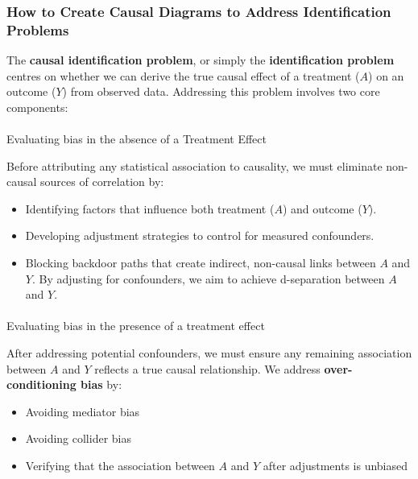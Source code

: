 \documentclass[
  singlecolumn]{article}
\makeatletter
\let\oldparagraph\paragraph
\renewcommand{\paragraph}{
    \@ifstar
      \xxxParagraphStar
      \xxxParagraphNoStar
  }
\newcommand{\xxxParagraphStar}[1]{\oldparagraph*{#1}\mbox{}}
\newcommand{\xxxParagraphNoStar}[1]{\oldparagraph{#1}\mbox{}}
\providecommand{\tightlist}{%
  \setlength{\itemsep}{0pt}\setlength{\parskip}{0pt}}\usepackage{longtable,booktabs,array}
\makeatother
\begin{document}
\subsubsection{How to Create Causal Diagrams to Address Identification
Problems}\label{how-to-create-causal-diagrams-to-address-identification-problems}

The \textbf{causal identification problem}, or simply the
\textbf{identification problem} centres on whether we can derive the
true causal effect of a treatment (\(A\)) on an outcome (\(Y\)) from
observed data. Addressing this problem involves two core components:

\paragraph{Evaluating bias in the absence of a Treatment
Effect}\label{evaluating-bias-in-the-absence-of-a-treatment-effect}

Before attributing any statistical association to causality, we must
eliminate non-causal sources of correlation by:

\begin{itemize}
\tightlist
\item
  Identifying factors that influence both treatment (\(A\)) and outcome
  (\(Y\)).
\item
  Developing adjustment strategies to control for measured confounders.
\item
  Blocking backdoor paths that create indirect, non-causal links between
  \(A\) and \(Y\). By adjusting for confounders, we aim to achieve
  d-separation between \(A\) and \(Y\).
\end{itemize}

\paragraph{Evaluating bias in the presence of a treatment
effect}\label{evaluating-bias-in-the-presence-of-a-treatment-effect}

After addressing potential confounders, we must ensure any remaining
association between \(A\) and \(Y\) reflects a true causal relationship.
We address \textbf{over-conditioning bias} by:

\begin{itemize}
\tightlist
\item
  Avoiding mediator bias
\item
  Avoiding collider bias
\item
  Verifying that the association between \(A\) and \(Y\) after
  adjustments is unbiased
\end{itemize}
\end{document}
